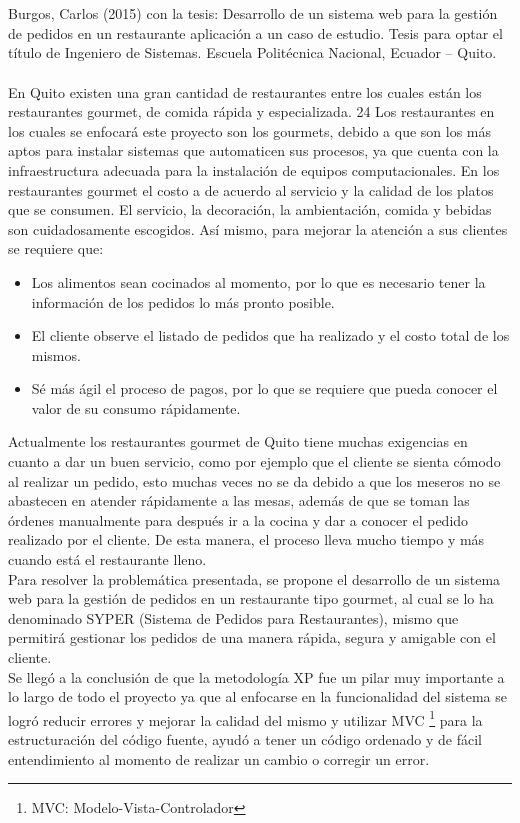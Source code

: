 \begin{large}
\\
\\
Burgos, Carlos (2015) con la tesis: Desarrollo de un sistema web para la gestión de pedidos en un restaurante aplicación a un caso de estudio. Tesis para optar el título de Ingeniero de Sistemas. Escuela Politécnica Nacional, Ecuador – Quito. 
\\
\\
En Quito existen una gran cantidad de restaurantes entre los cuales están los restaurantes gourmet, de comida rápida y especializada. 24 Los restaurantes en los cuales se enfocará este proyecto son los gourmets, debido a que son los más aptos para instalar sistemas que automaticen sus procesos, ya que cuenta con la infraestructura adecuada para la instalación de equipos computacionales. En los restaurantes gourmet el costo a de acuerdo al servicio y la calidad de los platos que se consumen. El servicio, la decoración, la ambientación, comida y bebidas son cuidadosamente escogidos. Así mismo, para mejorar la atención a sus clientes se requiere que: 
\begin{itemize}
    \item Los alimentos sean cocinados al momento, por lo que es necesario tener la información de los pedidos lo más pronto posible. 
    \item El cliente observe el listado de pedidos que ha realizado y el costo total de los mismos. 
    \item Sé más ágil el proceso de pagos, por lo que se requiere que pueda conocer el valor de su consumo rápidamente. 
\end{itemize}\leavevmode
Actualmente los restaurantes gourmet de Quito tiene muchas exigencias en cuanto a dar un buen servicio, como por ejemplo que el cliente se sienta cómodo al realizar un pedido, esto muchas veces no se da debido a que los meseros no se abastecen en atender rápidamente a las mesas, además de que se toman las órdenes manualmente para después ir a la cocina y dar a conocer el pedido realizado por el cliente. De esta manera, el proceso lleva mucho tiempo y más cuando está el restaurante lleno. 
\\
Para resolver la problemática presentada, se propone el desarrollo de un sistema web para la gestión de pedidos en un restaurante tipo gourmet, al cual se lo ha denominado SYPER (Sistema de Pedidos para Restaurantes), mismo que permitirá gestionar los pedidos de una manera rápida, segura y amigable con el cliente. \\
Se llegó a la conclusión de que la metodología XP fue un pilar muy importante a lo largo de todo el proyecto ya que al enfocarse en la funcionalidad del sistema se logró reducir errores y mejorar la calidad del mismo y utilizar MVC \footnote{MVC: Modelo-Vista-Controlador} para la estructuración del código fuente, ayudó a tener un código ordenado y de fácil entendimiento al momento de realizar un cambio o corregir un error.

\end{large}
